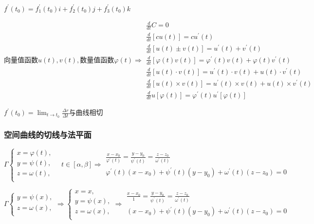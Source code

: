 \documentclass[UTF8]{ctexart}
\newcommand{\mt}[1]{\text{#1}}
\newcommand{\mf}[1]{\left( #1\right)}
\newcommand{\mfc}[1]{\left[ #1 \right]}
\newcommand{\q}{\quad}
\newcommand{\p}{\par}
\newcommand{\ma}[1]{\begin{array}{llll} #1 \end{array}}
\begin{document}
$f^{'}\mf{t_0}=f_1^{'}\mf{t_0}i+f_2^{'}\mf{t_0}j+f_3^{'}\mf{t_0}k$\p
$\mt{向量值函数}u\mf{t},v\mf{t},\mt{数量值函数}\varphi\mf{t} \Rightarrow\ma{
    \frac{d}{dt}C=0\\
    \frac{d}{dt}\mfc{cu\mf{t}}=cu^{'}\mf{t}\\
    \frac{d}{dt}\mfc{u\mf{t} \pm v\mf{t}}=u^{'}\mf{t}+v^{'}\mf{t}\\
    \frac{d}{dt}\mfc{\varphi\mf{t}  v\mf{t}}=\varphi^{'}\mf{t}v\mf{t}+\varphi\mf{t}v^{'}\mf{t}\\
    \frac{d}{dt}\mfc{u\mf{t} \cdot  v\mf{t}}=u^{'}\mf{t}\cdot v\mf{t}+u\mf{t}\cdot v^{'}\mf{t}\\
    \frac{d}{dt}\mfc{u\mf{t} \times  v\mf{t}}=u^{'}\mf{t}\times v\mf{t}+u\mf{t}\times v^{'}\mf{t}\\
    \frac{d}{dt}u\mfc{\varphi\mf{t}}=\varphi^{'}\mf{t}u^{'}\mfc{\varphi\mf{t}}
}$\p

$f^{'}\mf{t_0}=\lim_{t \rightarrow t_0}\frac{\Delta r}{\Delta t}\mt{与曲线相切}$

\subsubsection{空间曲线的切线与法平面}

$\Gamma \left\{\ma{
    x=\varphi\mf{t},\\
    y=\psi\mf{t},\\
    z=\omega\mf{t},\\
}\right. \q t \in \mfc{\alpha,\beta}\Rightarrow \ma{
    \frac{x-x_0}{\varphi^{'}\mf{t}}=\frac{y-y_0}{\psi^{'}\mf{t}}=\frac{z-z_0}{\omega^{'}\mf{t}}\\
    \varphi^{'}\mf{t}\mf{x-x_0}+\psi^{'}\mf{t}\mf{y-y_0}+\omega^{'}\mf{t}\mf{z-z_0}=0
}$\p

$\Gamma \left\{\ma{
    y=\psi\mf{x},\\
    z=\omega\mf{x},\\
}\right.\Rightarrow 
\left\{\ma{
    x=x,\\
    y=\psi\mf{x},\\
    z=\omega\mf{x},\\
}\right. \Rightarrow \ma{
    \frac{x-x_0}{1}=\frac{y-y_0}{\psi^{'}\mf{t}}=\frac{z-z_0}{\omega^{'}\mf{t}}\\
     \mf{x-x_0}+\psi^{'}\mf{t}\mf{y-y_0}+\omega^{'}\mf{t}\mf{z-z_0}=0
}$\p
\end{document}
